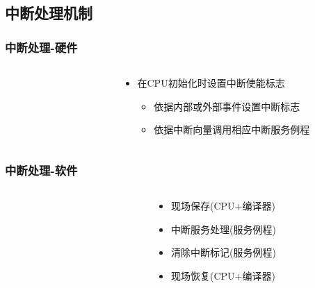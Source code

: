 \subsection{中断处理机制}
\begin{frame}
	\frametitle{中断处理-硬件}
    \begin{columns}
	    \begin{column}{0.5\textwidth}
        \begin{figure}
        \end{figure}
	    \end{column}
	    \begin{column}{0.5\textwidth}
    \begin{itemize}
        \item 在CPU初始化时设置中断使能标志
	    \begin{itemize}
    	    \item 依据内部或外部事件设置中断标志
    	    \item 依据中断向量调用相应中断服务例程
    	\end{itemize}
    \end{itemize}
	    \end{column}
    \end{columns}
\end{frame}
\begin{frame}
	\frametitle{中断处理-软件}
    \begin{columns}
	    \begin{column}{0.5\textwidth}
        \begin{figure}
        \end{figure}
	    \end{column}
	    \begin{column}{0.5\textwidth}
    		\begin{itemize}
    		    \item 现场保存(CPU+编译器)
    		    \item 中断服务处理(服务例程)
    		    \item 清除中断标记(服务例程)
    		    \item 现场恢复(CPU+编译器)
    		\end{itemize}
	    \end{column}
    \end{columns}
\end{frame}
